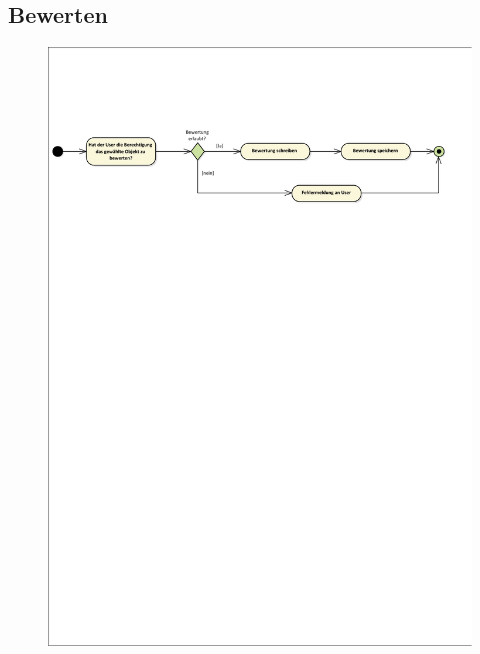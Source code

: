 \vfill

\subsection*{Bewerten}
\begin{figure}[h!]
	\centering
	\includegraphics[width=0.8\linewidth]{docs/3_Aktivitaetsdiagramme/Richard/bewerten.pdf}
	\label{fig:ActDia_Bewerten}
\end{figure}

\vfill
\pagebreak
\vfill

